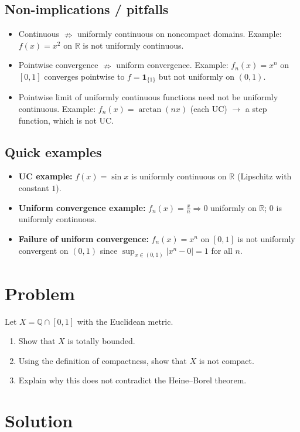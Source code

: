 \documentclass[12pt,a4paper]{article}
\begin{document}
\subsection*{Non-implications / pitfalls}
\begin{itemize}
	\item Continuous $\nRightarrow$ uniformly continuous on noncompact domains.  
	Example: $f(x)=x^2$ on $\mathbb{R}$ is not uniformly continuous.
	\item Pointwise convergence $\nRightarrow$ uniform convergence.  
	Example: $f_n(x)=x^n$ on $[0,1]$ converges pointwise to $f=\mathbf{1}_{\{1\}}$ but not uniformly on $(0,1)$.
	\item Pointwise limit of uniformly continuous functions need not be uniformly continuous.  
	Example: $f_n(x)=\arctan(nx)$ (each UC) $\to$ a step function, which is not UC.
\end{itemize}

\subsection*{Quick examples}
\begin{itemize}
	\item \textbf{UC example:} $f(x)=\sin x$ is uniformly continuous on $\mathbb{R}$ (Lipschitz with constant $1$).
	\item \textbf{Uniform convergence example:} $f_n(x)=\frac{x}{n}\Rightarrow 0$ uniformly on $\mathbb{R}$; $0$ is uniformly continuous.
	\item \textbf{Failure of uniform convergence:} $f_n(x)=x^n$ on $[0,1]$ is not uniformly convergent on $(0,1)$ since
	$\sup_{x\in(0,1)}|x^n-0|=1$ for all $n$.
\end{itemize}

\section*{Problem}
Let $X=\mathbb{Q}\cap[0,1]$ with the Euclidean metric.
\begin{enumerate}
	\item[(i)] Show that $X$ is totally bounded.
	\item[(ii)] Using the definition of compactness, show that $X$ is not compact.
	\item[(iii)] Explain why this does not contradict the Heine--Borel theorem.
\end{enumerate}

\section*{Solution}
\end{document}
